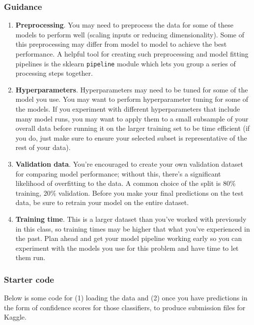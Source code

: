 \documentclass[
  letterpaper,
  DIV=11,
  numbers=noendperiod]{scrartcl}
\providecommand{\tightlist}{%
  \setlength{\itemsep}{0pt}\setlength{\parskip}{0pt}}\usepackage{longtable,booktabs,array}
\begin{document}
\subsubsection{Guidance}\label{guidance}

\begin{enumerate}
\def\labelenumi{\arabic{enumi}.}
\tightlist
\item
  \textbf{Preprocessing}. You may need to preprocess the data for some
  of these models to perform well (scaling inputs or reducing
  dimensionality). Some of this preprocessing may differ from model to
  model to achieve the best performance. A helpful tool for creating
  such preprocessing and model fitting pipelines is the sklearn
  \texttt{pipeline} module which lets you group a series of processing
  steps together.
\item
  \textbf{Hyperparameters}. Hyperparameters may need to be tuned for
  some of the model you use. You may want to perform hyperparameter
  tuning for some of the models. If you experiment with different
  hyperparameters that include many model runs, you may want to apply
  them to a small subsample of your overall data before running it on
  the larger training set to be time efficient (if you do, just make
  sure to ensure your selected subset is representative of the rest of
  your data).
\item
  \textbf{Validation data}. You're encouraged to create your own
  validation dataset for comparing model performance; without this,
  there's a significant likelihood of overfitting to the data. A common
  choice of the split is 80\% training, 20\% validation. Before you make
  your final predictions on the test data, be sure to retrain your model
  on the entire dataset.
\item
  \textbf{Training time}. This is a larger dataset than you've worked
  with previously in this class, so training times may be higher that
  what you've experienced in the past. Plan ahead and get your model
  pipeline working early so you can experiment with the models you use
  for this problem and have time to let them run.
\end{enumerate}

\subsubsection{Starter code}\label{starter-code}

Below is some code for (1) loading the data and (2) once you have
predictions in the form of confidence scores for those classifiers, to
produce submission files for Kaggle.
\end{document}
